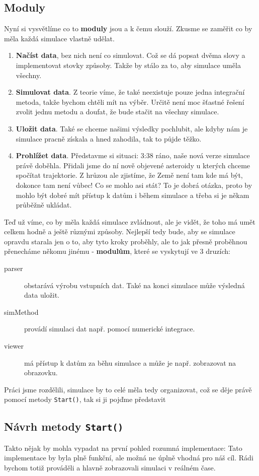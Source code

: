 \subsection{Moduly}
\label{sub:moduly}
Nyní si vysvětlíme co to \textbf{moduly} jsou a k čemu slouží.
Zkusme se zaměřit co by měla každá simulace vlastně udělat.
\begin{enumerate}
	\item \textbf{Načíst data}, bez nich není co simulovat. Což se dá popsat dvěma slovy a implementovat stovky způsoby. Takže by stálo za to, aby simulace uměla všechny.
	\item \textbf{Simulovat data}. Z teorie víme, že také neexistuje pouze jedna integrační metoda, takže bychom chtěli mít na výběr. Určitě není moc šťastné řešení zvolit jednu metodu a doufat, že bude stačit na všechny simulace.
	\item \textbf{Uložit data}. Také se chceme našimi výsledky pochlubit, ale kdyby nám je simulace pracně získala a hned zahodila, tak to půjde těžko.
	\item \textbf{Prohlížet data}. Představme si situaci: 3:38 ráno, naše nová verze simulace právě doběhla. Přidali jsme do ní nově objevené asteroidy u kterých chceme spočítat trajektorie. Z hrůzou ale zjistíme, že Země není tam kde má být, dokonce tam není vůbec! Co se mohlo asi stát? To je dobrá otázka, proto by mohlo být dobré mít přístup k datům i během simulace a třeba si je někam průběžně ukládat.
\end{enumerate}
Teď už víme, co by měla každá simulace zvládnout, ale je vidět, že toho má umět celkem hodně a ještě různými způsoby. Nejlepší tedy bude, aby se simulace opravdu starala jen o to, aby tyto kroky proběhly, ale to jak přesně proběhnou přenecháme někomu jinému -\textbf{ modulům}, které se vyskytují ve 3 druzích:
\begin{description}
	\item[parser] obstarává výrobu vstupních dat. Také na konci simulace může výsledná data uložit.
	\item[simMethod] provádí simulaci dat např. pomocí numerické integrace.
	\item[viewer] má přístup k datům za běhu simulace a může je např. zobrazovat na obrazovku.
\end{description}
Práci jsme rozdělili, simulace by to celé měla tedy organizovat, což se děje právě pomocí metody \texttt{Start()}, tak si ji pojďme představit
\subsection{Návrh metody \texttt{Start()}}
Takto nějak by mohla vypadat na první pohled rozumná implementace:
Tato implementace by byla plně funkční, ale možná ne úplně vhodná pro náš cíl. Rádi bychom totiž prováděli a hlavně zobrazovali simulaci v reálném čase. 
